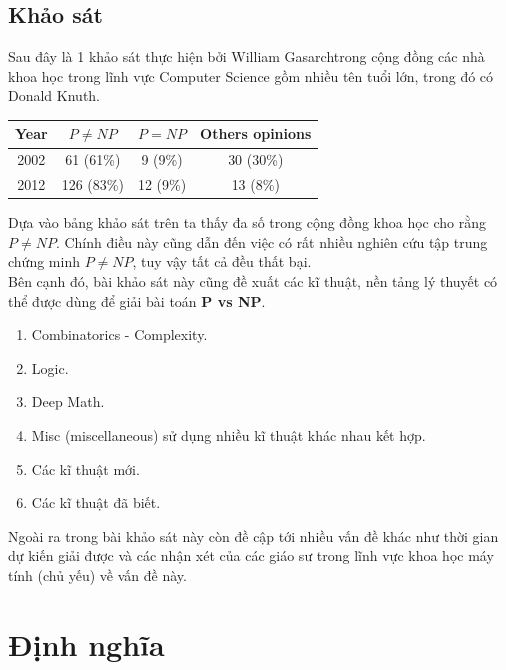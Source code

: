 \documentclass[a4paper 14pt]{article}
\begin{document}
		\subsection{Khảo sát}
			Sau đây là 1 khảo sát thực hiện bởi  William Gasarch\footnotemark trong cộng đồng các nhà khoa học trong lĩnh vực Computer Science gồm nhiều tên tuổi lớn, trong đó có Donald Knuth. \cite{Poll}
			\begin{table}[H]
				\begin{tabular}{|c|c|c|c|}
					\hline
					Year & $P \neq NP$ & $P = NP$ & Others opinions\\ \hline
					2002 & 61 (61\%) & 9 (9\%) & 30 (30\%)\\ \hline
					2012 & 126 (83\%) & 12 (9\%) & 13 (8\%)\\ \hline
				\end{tabular}
			\end{table}	
			Dựa vào bảng khảo sát trên ta thấy đa số trong cộng đồng khoa học cho rằng $P \neq NP$. Chính điều này cũng dẫn đến việc có rất nhiều nghiên cứu tập trung chứng minh $P \neq NP$, tuy vậy tất cả đều thất bại.\\
			Bên cạnh đó, bài khảo sát này cũng đề xuất các kĩ thuật, nền tảng lý thuyết có thể được dùng để giải bài toán \textbf{P vs NP}.
			\begin{enumerate}
				\item Combinatorics - Complexity.
				\item Logic.
				\item Deep Math.
				\item Misc (miscellaneous) sử dụng nhiều kĩ thuật khác nhau kết hợp.
				\item Các kĩ thuật mới.
				\item Các kĩ thuật đã biết.
			\end{enumerate}
			Ngoài ra trong bài khảo sát này còn đề cập tới nhiều vấn đề khác như thời gian dự kiến giải được và các nhận xét của các giáo sư trong lĩnh vực khoa học máy tính (chủ yếu) về vấn đề này.
	\section{Định nghĩa}
\end{document}
